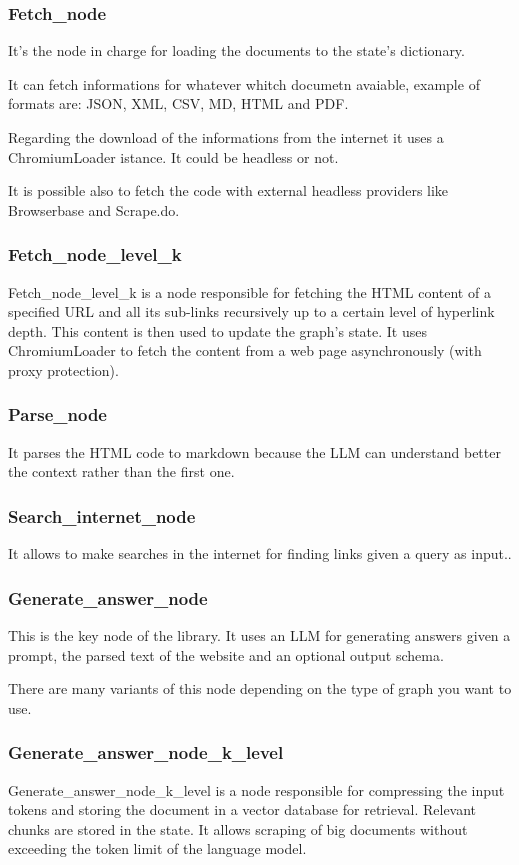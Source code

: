 \subsubsection{Fetch\_node}
It's the node in charge for loading the documents to the state's dictionary.

It can fetch informations for whatever whitch documetn avaiable, example of formats are: JSON, XML, CSV, MD, HTML and PDF.

Regarding the download of the informations from the internet it uses a ChromiumLoader istance. It could be headless or not.

It is possible  also to fetch the code with external headless providers like Browserbase and Scrape.do.

\subsubsection{Fetch\_node\_level\_k}
Fetch\_node\_level\_k is a node responsible for fetching the HTML content of a specified URL and all its sub-links recursively up to a certain level of hyperlink depth. This content is then used to update the graph's state. It uses ChromiumLoader to fetch the content from a web page asynchronously (with proxy protection).

\subsubsection{Parse\_node}
It parses the HTML code to markdown because the LLM can understand better the context rather than the first one.

\subsubsection{Search\_internet\_node}
It allows to make searches in the internet for finding links given a query as input..

\subsubsection{Generate\_answer\_node}
This is the key node of the library. It uses an LLM for generating answers given a prompt, the parsed text of the website and an optional output schema.

There are many variants of this node depending on the type of graph you want to use.

\subsubsection{Generate\_answer\_node\_k\_level}
Generate\_answer\_node\_k\_level is a node responsible for compressing the input tokens and storing the document in a vector database for retrieval. Relevant chunks are stored in the state. It allows scraping of big documents without exceeding the token limit of the language model.


